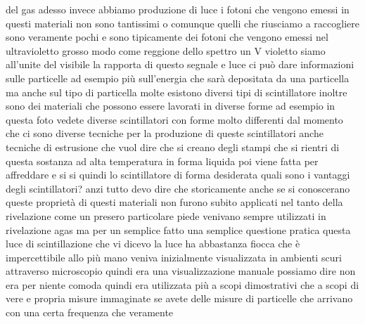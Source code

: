 del gas adesso invece abbiamo produzione di luce i fotoni che vengono emessi in questi materiali non sono tantissimi o comunque quelli che riusciamo a raccogliere sono veramente pochi e sono tipicamente dei fotoni che vengono emessi nel ultravioletto grosso modo come reggione dello spettro un V violetto siamo all'unite del visibile la rapporta di questo segnale e luce ci può dare informazioni sulle particelle ad esempio più sull'energia che sarà depositata da una particella ma anche sul tipo di particella molte esistono diversi tipi di scintillatore inoltre sono dei materiali che possono essere lavorati in diverse forme ad esempio in questa foto vedete diverse scintillatori con forme molto differenti dal momento che ci sono diverse tecniche per la produzione di queste scintillatori anche tecniche di estrusione che vuol dire che si creano degli stampi che si rientri di questa sostanza ad alta temperatura in forma liquida poi viene fatta per affreddare e si si quindi lo scintillatore di forma desiderata quali sono i vantaggi degli scintillatori? anzi tutto devo dire che storicamente anche se si conoscerano queste proprietà di questi materiali non furono subito applicati nel tanto della rivelazione come un presero particolare piede venivano sempre utilizzati in rivelazione agas ma per un semplice fatto una semplice questione pratica questa luce di scintillazione che vi dicevo la luce ha abbastanza fiocca che è impercettibile allo più mano veniva inizialmente visualizzata in ambienti scuri attraverso microscopio quindi era una visualizzazione manuale possiamo dire non era per niente comoda quindi era utilizzata più a scopi dimostrativi che a scopi di vere e propria misure immaginate se avete delle misure di particelle che arrivano con una certa frequenza che veramente 

